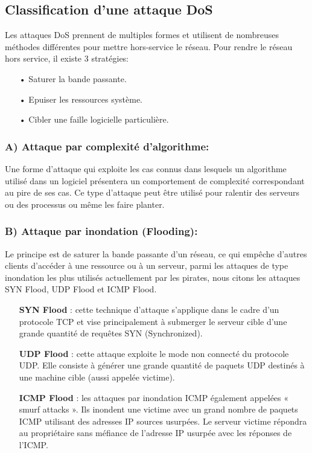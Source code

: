 \subsection{Classification d'une attaque DoS}
Les attaques DoS prennent de multiples formes et utilisent de nombreuses méthodes différentes pour mettre hors-service le réseau.
Pour rendre le réseau hors service, il existe 3 stratégies:\\
\begin{itemize}
\item[•]Saturer la bande passante.
\item[•]Epuiser les ressources système.
\item[•]Cibler une faille logicielle particulière.
\end{itemize} 

\subsubsection{A) Attaque par complexité d’algorithme:}
Une forme d’attaque qui exploite les cas connus dans lesquels un algorithme utilisé dans un logiciel présentera un comportement de complexité correspondant au pire de ses cas. Ce type d’attaque peut être utilisé pour ralentir des serveurs ou des processus ou même les faire planter. 
\subsubsection{B) Attaque par inondation (Flooding):}
Le principe est de saturer la bande passante d’un réseau, ce qui empêche d'autres clients d’accéder à une ressource ou à un serveur, parmi les attaques de type inondation les plus utilisés actuellement par les pirates, nous citons les attaques SYN Flood, UDP Flood et ICMP Flood.\\
\begin{itemize}
\item[\textbf{SYN Flood}]: cette technique d’attaque s’applique dans le cadre d’un protocole TCP et vise principalement à submerger le serveur cible d’une grande quantité de requêtes SYN (Synchronized).\\
\item[\textbf{UDP Flood}]: cette attaque exploite le mode non connecté du protocole UDP. Elle consiste à générer une grande quantité de paquets UDP destinés à une machine cible (aussi appelée victime).\\
\item[\textbf{ICMP Flood}]: les attaques par inondation ICMP également appelées « smurf attacks ». Ils inondent une victime avec un grand nombre de paquets ICMP utilisant des adresses IP sources usurpées. Le serveur victime répondra au propriétaire sans méfiance de l'adresse IP usurpée avec les réponses de l'ICMP.\\
\end{itemize}


